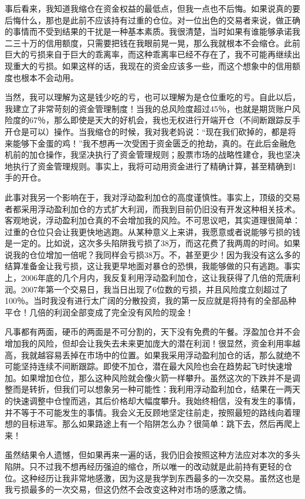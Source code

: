 事后看来，我知道我缩仓在资金权益的最低点，但我一点也不后悔。如果说真的要后悔什么，那也是此前不应该持有过重的仓位。对一位出色的交易者来说，做正确的事情而不受到结果的干扰是一种基本素质。我很清楚，当时如果有谁能够承诺我二三十万的信用额度，只需要把钱在我眼前晃一晃，那么我就根本不会缩仓。此前巨大的亏损来自于巨大的乖离率，而这种乖离率已经不存在了，我不可能再继续出现重大的亏损。如果这样的话，我现在的资金应该多一些，而这个想象中的信用额度也根本不会动用。

当然，我可以理解为这是钱少吃的亏，也可以理解为是仓位重吃的亏。自此以后，我建立了非常苛刻的资金管理制度！当我的总风险度超过45％，也就是期货账户风险度的67％，那么即使是天大的好机会，我也无权进行开端开仓（不间断跟踪反手开仓是可以）操作。当我缩仓的时候，我对我老妈说：“现在我们砍掉的，都是将来能够下金蛋的鸡！”我不想再一次受困于资金匮乏的抢劫，真的。在此后金融危机前的加仓操作，我坚决执行了资金管理规则；股票市场的战略性建仓，我也坚决地执行了资金管理规则。事实上，我将可动用资金进行了精确计算，甚至精确到1手的开仓。

此事对我另一个影响在于，我对浮动盈利加仓的高度谨慎性。事实上，顶级的交易者都采用浮动盈利加仓的方式扩大利润，而我到目前仍旧没有开发这种相关技术。客观地说，浮动盈利加仓真的不会增加我的风险。不可思议吧，其实道理很简单：过重的仓位只会让我更快地逃跑。从某种意义上来讲，我愿意或者说能够亏损的钱是一定的。比如说，这次多头陷阱我亏损了38万，而这花费了我两周的时间。如果说我的仓位增加一倍呢？我同样会亏损38万。不，甚至更少！因为我没有这么多的结算准备金让我亏损，这让我更早地面对暴仓的恐惧，我能够做的只有逃跑。事实上，2006年底的几个月内，我反复利用浮动盈利加仓，这让我获得了几倍的荒唐利润。2007年第一个交易日，我当日出现了6位数的亏损，并且风险度立刻超过了100％。当时我没有进行太广阔的分散投资，我的第一反应就是将持有的全部品种平仓！几倍的利润全部变成了完全没有风险的现金！

凡事都有两面，硬币的两面是不可分割的，天下没有免费的午餐。浮盈加仓并不会增加我的风险，但却会让我失去未来更加庞大的潜在利润！很显然，资金利用率越高，我就越容易丢掉在市场中的位置。如果我采用浮动盈利加仓的话，那么就绝不可能坚持连续不间断跟踪。即使不加仓，潜在最大风险也会在趋势起飞时快速增加。如果增加仓位，那么这种风险就会像火箭一样攀升。虽然这次的下跌并不是调整而是转折，但我们可以想象另一种可能性：我利用浮动盈利加仓，结果在一两天的快速调整中仓惶而逃，其后价格却大幅度攀升。我始终相信，没有发生的事情，并不等于不可能发生的事情。我会义无反顾地坚定往前走，按照最短的路线向着理想的目标进军。那么如果路途上有一个陷阱怎么办？很简单：跳下去，然后再爬上来！

虽然结果令人遗憾，但如果再来一遍的话，我仍旧会按照这种方法应对本次的多头陷阱。只不过我不想再经历强迫的缩仓，所以唯一的改动就是此前持有更轻的仓位。这种经历让我非常地感激，因为这是我学到东西最多的一次交易。虽然这也是我亏损最多的一次交易，但这仍然不会改变这种对市场的感激之情。

